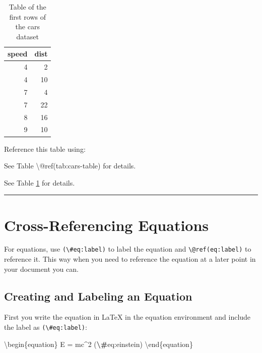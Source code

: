 \documentclass[
]{book}
\newenvironment{Shaded}{\begin{snugshade}}{\end{snugshade}}
\newcommand{\NormalTok}[1]{#1}
\newcommand{\SpecialCharTok}[1]{\textcolor[rgb]{0.81,0.36,0.00}{\textbf{#1}}}
\theoremstyle{definition}
\theoremstyle{definition}
\theoremstyle{definition}
\theoremstyle{definition}
\theoremstyle{remark}
\begin{document}
\begin{table}

\caption{\label{tab:cars-table}Table of the first rows of the cars dataset}
\centering
\begin{tabular}[t]{r|r}
\hline
speed & dist\\
\hline
4 & 2\\
\hline
4 & 10\\
\hline
7 & 4\\
\hline
7 & 22\\
\hline
8 & 16\\
\hline
9 & 10\\
\hline
\end{tabular}
\end{table}

Reference this table using:

\begin{Shaded}
\begin{Highlighting}[]
\NormalTok{See Table \textbackslash{}@ref(tab:cars{-}table) for details.}
\end{Highlighting}
\end{Shaded}

See Table \ref{tab:cars-table} for details.

\begin{center}\rule{0.5\linewidth}{0.5pt}\end{center}

\section{Cross-Referencing Equations}\label{cross-referencing-equations}

For equations, use \texttt{(\textbackslash{}\#eq:label)} to label the equation and \texttt{\textbackslash{}@ref(eq:label)} to reference it. This way when you need to reference the equation at a later point in your document you can.

\subsection{Creating and Labeling an Equation}\label{creating-and-labeling-an-equation}

First you write the equation in LaTeX in the equation environment and include the label as \texttt{(\textbackslash{}\#eq:label)}:

\begin{Shaded}
\begin{Highlighting}[]
\NormalTok{\textbackslash{}begin\{equation\}}
\NormalTok{  E = mc\^{}2}
\NormalTok{  (}\SpecialCharTok{\textbackslash{}\#}\NormalTok{eq:einstein)}
\NormalTok{\textbackslash{}end\{equation\}}
\end{Highlighting}
\end{Shaded}
\end{document}
